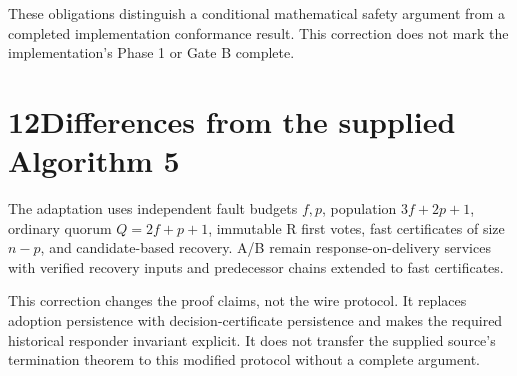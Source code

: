 \documentclass[11pt,a4paper]{article}
\newcommand{\page}[1]{\clearpage\setcounter{page}{#1}}
\begin{document}
These obligations distinguish a conditional mathematical safety argument from a completed implementation conformance result. This correction does not mark the implementation's Phase 1 or Gate B complete.
\page{15}
\section*{12\quad Differences from the supplied Algorithm 5}
The adaptation uses independent fault budgets $f,p$, population $3f+2p+1$, ordinary quorum $Q=2f+p+1$, immutable R first votes, fast certificates of size $n-p$, and candidate-based recovery. A/B remain response-on-delivery services with verified recovery inputs and predecessor chains extended to fast certificates.

This correction changes the proof claims, not the wire protocol. It replaces adoption persistence with decision-certificate persistence and makes the required historical responder invariant explicit. It does not transfer the supplied source's termination theorem to this modified protocol without a complete argument.
\end{document}
